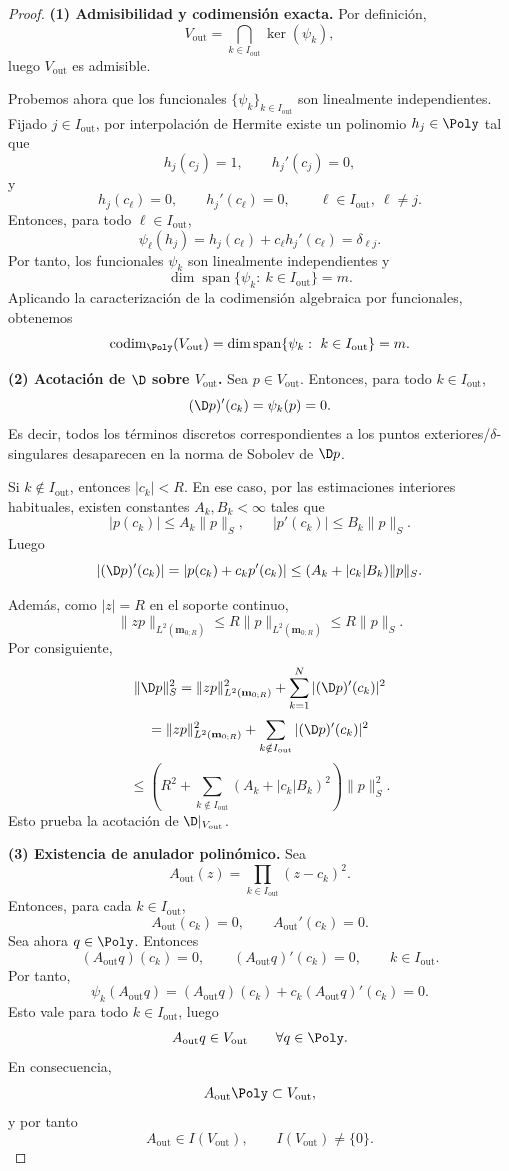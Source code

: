 \begin{proof}
	\textbf{(1) Admisibilidad y codimensión exacta.}
	Por definición,
	\[
		V_{\mathrm{out}}=\bigcap_{k\in I_{\mathrm{out}}}\ker(\psi_k),
	\]
	luego $V_{\mathrm{out}}$ es admisible.

	Probemos ahora que los funcionales $\{\psi_k\}_{k\in I_{\mathrm{out}}}$ son linealmente
	independientes. Fijado $j\in I_{\mathrm{out}}$, por interpolación de Hermite existe un
	polinomio $h_j\in\Poly$ tal que
	\[
		h_j(c_j)=1,\qquad h_j'(c_j)=0,
	\]
	y
	\[
		h_j(c_\ell)=0,\qquad h_j'(c_\ell)=0,
		\qquad \ell\in I_{\mathrm{out}},\ \ell\neq j.
	\]
	Entonces, para todo $\ell\in I_{\mathrm{out}}$,
	\[
		\psi_\ell(h_j)=h_j(c_\ell)+c_\ell h_j'(c_\ell)=\delta_{\ell j}.
	\]
	Por tanto, los funcionales $\psi_k$ son linealmente independientes y
	\[
		\dim\operatorname{span}\{\psi_k:\ k\in I_{\mathrm{out}}\}=m.
	\]
	Aplicando la caracterización de la codimensión algebraica por funcionales, obtenemos
	\[
		\operatorname{codim}_{\Poly}(V_{\mathrm{out}})
		=
		\dim\operatorname{span}\{\psi_k:\ k\in I_{\mathrm{out}}\}
		=
		m.
	\]

	\medskip
	\textbf{(2) Acotación de $\D$ sobre $V_{\mathrm{out}}$.}
	Sea $p\in V_{\mathrm{out}}$. Entonces, para todo $k\in I_{\mathrm{out}}$,
	\[
		(\D p)'(c_k)=\psi_k(p)=0.
	\]
	Es decir, todos los términos discretos correspondientes a los puntos exteriores/$\delta$-singulares
	desaparecen en la norma de Sobolev de $\D p$.

	Si $k\notin I_{\mathrm{out}}$, entonces $|c_k|<R$. En ese caso, por las estimaciones
	interiores habituales, existen constantes $A_k,B_k<\infty$ tales que
	\[
		|p(c_k)|\le A_k\|p\|_S,
		\qquad
		|p'(c_k)|\le B_k\|p\|_S.
	\]
	Luego
	\[
		|(\D p)'(c_k)|
		=
		|p(c_k)+c_kp'(c_k)|
		\le
		(A_k+|c_k|B_k)\|p\|_S.
	\]

	Además, como $|z|=R$ en el soporte continuo,
	\[
		\|zp\|_{L^2(\mathbf{m}_{0;R})}\le R\|p\|_{L^2(\mathbf{m}_{0;R})}\le R\|p\|_S.
	\]
	Por consiguiente,
	\[
		\|\D p\|_S^2
		=
		\|zp\|_{L^2(\mathbf{m}_{0;R})}^2
		+
		\sum_{k=1}^N |(\D p)'(c_k)|^2
	\]
	\[
		=
		\|zp\|_{L^2(\mathbf{m}_{0;R})}^2
		+
		\sum_{k\notin I_{\mathrm{out}}} |(\D p)'(c_k)|^2
	\]
	\[
		\le
		\left(
		R^2+\sum_{k\notin I_{\mathrm{out}}}(A_k+|c_k|B_k)^2
		\right)\|p\|_S^2.
	\]
	Esto prueba la acotación de $\D|_{V_{\mathrm{out}}}$.

	\medskip
	\textbf{(3) Existencia de anulador polinómico.}
	Sea
	\[
		A_{\mathrm{out}}(z)=\prod_{k\in I_{\mathrm{out}}}(z-c_k)^2.
	\]
	Entonces, para cada $k\in I_{\mathrm{out}}$,
	\[
		A_{\mathrm{out}}(c_k)=0,
		\qquad
		A_{\mathrm{out}}'(c_k)=0.
	\]
	Sea ahora $q\in\Poly$. Entonces
	\[
		(A_{\mathrm{out}}q)(c_k)=0,
		\qquad
		(A_{\mathrm{out}}q)'(c_k)=0,
		\qquad k\in I_{\mathrm{out}}.
	\]
	Por tanto,
	\[
		\psi_k(A_{\mathrm{out}}q)
		=
		(A_{\mathrm{out}}q)(c_k)+c_k(A_{\mathrm{out}}q)'(c_k)
		=
		0.
	\]
	Esto vale para todo $k\in I_{\mathrm{out}}$, luego
	\[
		A_{\mathrm{out}}q\in V_{\mathrm{out}}
		\qquad \forall q\in\Poly.
	\]
	En consecuencia,
	\[
		A_{\mathrm{out}}\Poly\subset V_{\mathrm{out}},
	\]
	y por tanto
	\[
		A_{\mathrm{out}}\in I(V_{\mathrm{out}}),
		\qquad
		I(V_{\mathrm{out}})\neq\{0\}.
	\]


\end{proof}
